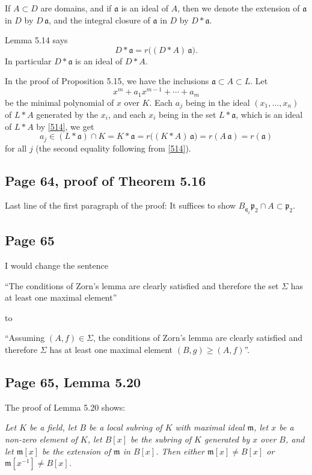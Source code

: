 \documentclass[parskip=half,fontsize=12pt]{scrartcl}%
\newcommand{\mf}{\mathfrak}
\newcommand{\mmm}{\mf m}
\newcommand{\ppp}{\mf p}
\begin{document}
If $A\subset D$ are domains, and if $\mf a$ is an ideal of $A$, then we denote the extension of $\mf a$ in $D$ by $D\,\mf a$, and the integral closure of $\mf a$ in $D$ by $D*\mf a$. 

Lemma 5.14 says
\begin{equation}\label{514}
D*\mf a=r\Big((D*A)\,\mf a\Big).
\end{equation}
In particular $D*\mf a$ is an ideal of $D*A$. 

In the proof of Proposition 5.15, we have the inclusions $\mf a\subset A\subset L$. Let 
$$
x^m+a_1x^{m-1}+\cdots+a_m
$$ 
be the minimal polynomial of $x$ over $K$. Each $a_j$ being in the ideal $(x_1,\dots,x_n)$ of $L*A$ generated by the $x_i$, and each $x_i$ being in the set $L*\mf a$, which is an ideal of $L*A$ by \eqref{514}, we get 
$$
a_j\in(L*\mf a)\cap K=K*\mf a=r\Big((K*A)\,\mf a\Big)=r(A\,\mf a)=r(\mf a)
$$ 
for all $j$ (the second equality following from \eqref{514}).

\subsection{Page 64, proof of Theorem 5.16}%

Last line of the first paragraph of the proof: It suffices to show $B_{\mf q_1}\ppp_2\cap A\subset\ppp_2$.

\subsection{Page 65}\label{65}%

I would change the sentence

``The conditions of Zorn's lemma are clearly satisfied and therefore the set $\Sigma$ has at least one maximal element''

to 

``Assuming $(A,f)\in\Sigma$, the conditions of Zorn's lemma are clearly satisfied and therefore $\Sigma$ has at least one maximal element $(B,g)\ge(A,f)$''. %

\subsection{Page 65, Lemma 5.20}\label{520}%

The proof of Lemma 5.20 shows:

\emph{Let $K$ be a field, let $B$ be a local subring of $K$ with maximal ideal $\mmm$, let $x$ be a non-zero element of $K$, let $B[x]$ be the subring of $K$ generated by $x$ over $B$, and let $\mmm[x]$ be the extension of $\mmm$ in $B[x]$. Then either $\mmm[x]\ne B[x]$ or $\mmm[x^{-1}]\ne B[x]$.}
\end{document}
